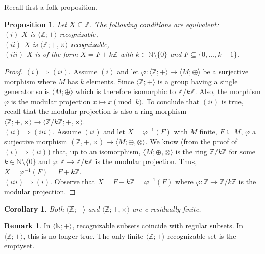\documentclass[11pt,a4paper]{article}
\newtheorem{proposition}[theorem]{Proposition}
\newtheorem{corollary}[theorem]{Corollary}
\theoremstyle{definition} %
\newtheorem{remark}[theorem]{Remark}
\newcommand\+[1]{\mathcal{#1}} %
\newcommand{\N}{{\mathbb N}}     %
\newcommand{\Z}{{\mathbb Z}}     %
\begin{document}
Recall first a folk proposition. 
\begin{proposition}\label{p:rec Z}
Let $X\subseteq\Z$. The following conditions are equivalent:\\
$(i)$  $X$ is $ \langle  \Z ;+\rangle$-recognizable,\\
$(ii)$  $X$ is $ \langle  \Z ;+,\times\rangle$-recognizable,\\
$(iii)$ $X$ is of the form $X=F+k\Z$ with $k\in\N\setminus\{0\}$ and $F\subseteq\{0,\ldots,k-1\}$.
\end{proposition}
%
\begin{proof}
$(i)\Rightarrow(ii)$.
Assume $(i)$ and let $\varphi: \langle  \Z ;+\rangle\to \langle M;\oplus\rangle$ be a surjective morphism
where $M$ has $k$ elements.
Since  $ \langle  \Z ;+\rangle$ is a   group having a single generator
so is $\langle M;\oplus\rangle$
which is therefore isomorphic to $\Z/k\Z$.
Also, the morphism $\varphi$ is the modular projection $x\mapsto x\pmod k$.
To conclude that $(ii)$ is true, recall that the modular projection is also a ring morphism
$ \langle  \Z ;+,\times\rangle\to \langle\Z/k\Z;+,\times\rangle$.
%
\smallskip\\
$(ii)\Rightarrow(iii)$. 
Assume $(ii)$ and let $X=\varphi^{-1}(F)$ with $M$ finite,  $F\subseteq M$, $\varphi$ a surjective morphism $(\Z,+,\times)\to\langle M;\oplus,\otimes\rangle$.
We know (from the proof of $(i)\Rightarrow(ii)$) that, up to an isomorphism,
$\langle M;\oplus,\otimes\rangle$ is the ring $\Z/k\Z$ for some $k\in\N\setminus\{0\}$
and $\varphi:\Z\to\Z/k\Z$ is the modular projection.
Thus, $X=\varphi^{-1}(F)=F+k\Z$.
%
\smallskip\\
$(iii)\Rightarrow(i)$. Observe that $X=F+k\Z=\varphi^{-1}(F)$ 
where $\varphi:\Z\to\Z/k\Z$ is the modular projection.
\end{proof}
\fi%
%
%

%
\begin{corollary} \label{cor:Z residually finite}
Both $\langle  \Z ;+\rangle$ and $\langle  \Z ;+,\times \rangle$ 
 are c-residually finite.
\end{corollary}
%
\begin{remark}  In $ \langle  \N ;+\rangle$, recognizable subsets coincide with   regular subsets. In $ \langle  \Z ;+\rangle$, this is no longer true.  The  only finite $\langle  \Z ;+\rangle$-recognizable set is the emptyset. 
\end{remark}
%
\end{document}
